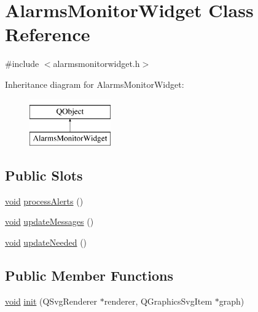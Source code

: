\hypertarget{class_alarms_monitor_widget}{\section{Alarms\-Monitor\-Widget Class Reference}
\label{class_alarms_monitor_widget}
}


{\ttfamily \#include $<$alarmsmonitorwidget.\-h$>$}

Inheritance diagram for Alarms\-Monitor\-Widget\-:\begin{figure}[H]
\begin{center}
\leavevmode
\includegraphics[height=2.000000cm]{class_alarms_monitor_widget}
\end{center}
\end{figure}
\subsection*{Public Slots}
\begin{DoxyCompactItemize}
\item 
\hyperlink{group___u_a_v_objects_plugin_ga444cf2ff3f0ecbe028adce838d373f5c}{void} \hyperlink{group___core_plugin_ga8618886c20a264458193f109665ee641}{process\-Alerts} ()
\item 
\hyperlink{group___u_a_v_objects_plugin_ga444cf2ff3f0ecbe028adce838d373f5c}{void} \hyperlink{group___core_plugin_ga898e37685ca3daea962f390013dd9aed}{update\-Messages} ()
\item 
\hyperlink{group___u_a_v_objects_plugin_ga444cf2ff3f0ecbe028adce838d373f5c}{void} \hyperlink{group___core_plugin_ga1a22860e7935d58f9b621150bb2f5322}{update\-Needed} ()
\end{DoxyCompactItemize}
\subsection*{Public Member Functions}
\begin{DoxyCompactItemize}
\item 
\hyperlink{group___u_a_v_objects_plugin_ga444cf2ff3f0ecbe028adce838d373f5c}{void} \hyperlink{group___core_plugin_ga1e4449a52ae8ec79153006b4cc59248a}{init} (Q\-Svg\-Renderer $\ast$renderer, Q\-Graphics\-Svg\-Item $\ast$graph)
\end{DoxyCompactItemize}
